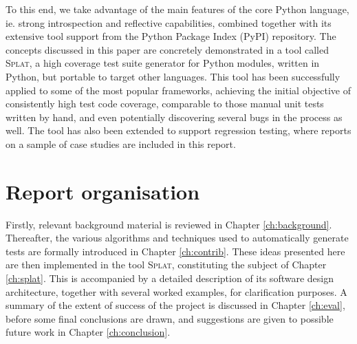 To this end, we take advantage of the main features of the core Python language, ie. strong introspection and reflective capabilities, combined together with its extensive tool support from the Python Package Index (PyPI) repository.
\clearpage
The concepts discussed in this paper are concretely demonstrated in a tool called \textsc{Splat}, a high coverage test suite generator for Python modules, written in Python, but portable to target other languages. This tool has been successfully applied to some of the most popular frameworks, achieving the initial objective of consistently high test code coverage, comparable to those manual unit tests written by hand, and even potentially discovering several bugs in the process as well. The tool has also been extended to support regression testing, where reports on a sample of case studies are included in this report.

\section{Report organisation}
Firstly, relevant background material is reviewed in Chapter \ref{ch:background}. Thereafter, the various algorithms and techniques used to automatically generate tests are formally introduced in Chapter \ref{ch:contrib}. These ideas presented here are then implemented in the tool \textsc{Splat}, constituting the subject of Chapter \ref{ch:splat}. This is accompanied by a detailed description of its software design architecture, together with several worked examples, for clarification purposes. A summary of the extent of success of the project is discussed in Chapter \ref{ch:eval}, before some final conclusions are drawn, and suggestions are given to possible future work in Chapter \ref{ch:conclusion}.
